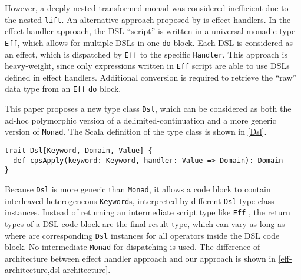 However, a deeply nested transformed monad was considered inefficient  due to the nested \lstinline{lift}. An alternative approach proposed by
\cite{kiselyov2013extensible} is effect handlers. In the effect handler approach, the DSL ``script'' is written in a universal monadic type \lstinline{Eff}, which allows for multiple DSLs in one \lstinline{do} block. Each DSL is considered as an effect, which is dispatched by \lstinline{Eff} to the specific \lstinline{Handler}. This approach is heavy-weight, since only expressions written in \lstinline{Eff} script are able to use DSLs defined in effect handlers. Additional conversion is required to retrieve the ``raw'' data type from an \lstinline{Eff} \lstinline{do} block.

This paper proposes a new type class \lstinline{Dsl}, which can be considered as both the ad-hoc polymorphic version of a delimited-continuation and a more generic version of \lstinline{Monad}. The Scala definition of the type class is shown in \cref{Dsl}.

\begin{lstlisting}[caption={The definition of \lstinline{Dsl} type class},label={Dsl}]
trait Dsl[Keyword, Domain, Value] {
  def cpsApply(keyword: Keyword, handler: Value => Domain): Domain
}
\end{lstlisting}

Because \lstinline{Dsl} is more generic than \lstinline{Monad}, it allows a code block to contain interleaved heterogeneous \lstinline{Keyword}s, interpreted by different \lstinline{Dsl} type class instances. Instead of returning an intermediate script type like \lstinline{Eff} \cite{kiselyov2013extensible}, the return types of a DSL code block are the final result type, which can vary as long as where are corresponding \lstinline{Dsl} instances for all operators inside the DSL code block. No intermediate \lstinline{Monad} for dispatching is used. The difference of architecture between effect handler approach and our approach is shown in \cref{eff-architecture,dsl-architecture}.

